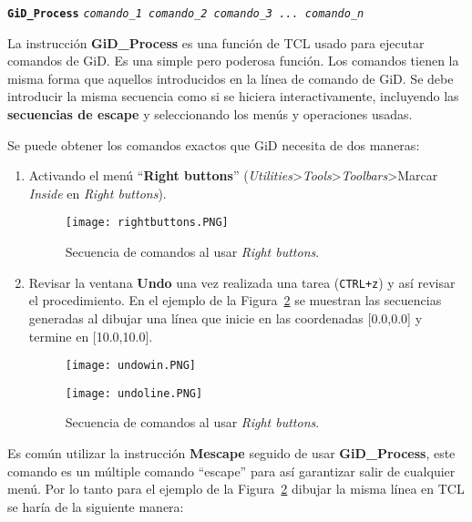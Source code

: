 \documentclass[10pt, a4paper, twocolumn]{article}
\begin{document}
\vspace{0.20cm}
\begin{center}
	\textbf{\texttt{GiD\_Process}} \texttt{\textit{comando\_1 comando\_2 comando\_3 ... comando\_n}}
\end{center}
\vspace{0.20cm}


La instrucción \textbf{GiD\_Process} es una función de TCL usado para ejecutar comandos de GiD. Es una simple pero poderosa función. Los comandos tienen la misma forma que aquellos introducidos en la línea de comando de GiD. Se debe introducir la misma secuencia como si se hiciera interactivamente, incluyendo las \textbf{secuencias de escape} y seleccionando los menús y operaciones usadas.

Se puede obtener los comandos exactos que GiD necesita de dos maneras:

\begin{enumerate}
	\item Activando el menú ``\textbf{Right buttons}'' (\textit{Utilities}>\textit{Tools}>\textit{Toolbars}>Marcar \textit{Inside} en \textit{Right buttons}).	
	\begin{figure}[hbtp!]
	\centering
	\texttt{[image: rightbuttons.PNG]}
	\caption{Secuencia de comandos al usar \textit{Right buttons}.\label{fig:rightbuttons}}
\end{figure}
	\item Revisar la ventana \textbf{Undo} una vez realizada una tarea (\texttt{CTRL+z}) y así revisar el procedimiento. En el ejemplo de la Figura~\ref{fig:undo} se muestran las secuencias generadas al dibujar una línea que inicie en las coordenadas [0.0,0.0] y termine en [10.0,10.0].
	\begin{figure}[hbtp!]
	\centering
	\begin{minipage}[t]{0.2\textwidth}
	\texttt{[image: undowin.PNG]}
	\end{minipage}
	\begin{minipage}[t]{0.16\textwidth}
	\texttt{[image: undoline.PNG]}
	\end{minipage}
	\caption{Secuencia de comandos al usar \textit{Right buttons}.\label{fig:undo}}
\end{figure}
	
\end{enumerate}
\newpage
Es común utilizar la instrucción \textbf{Mescape} seguido de usar \textbf{GiD\_Process}, este comando es un múltiple comando ``escape'' para así garantizar salir de cualquier menú. Por lo tanto para el ejemplo de la Figura~\ref{fig:undo} dibujar la misma línea en TCL se haría de la siguiente manera:
\end{document}
